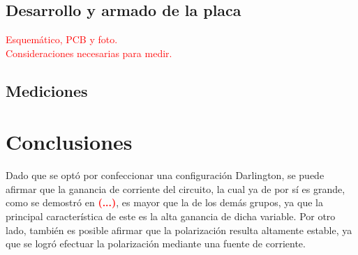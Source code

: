 \subsection{Desarrollo y armado de la placa}
\begin{center}
	\LARGE{\textcolor{red}{Esquemático, PCB y foto.}}\\
	\LARGE{\textcolor{red}{Consideraciones necesarias para medir.}}
\end{center}

\subsection{Mediciones}

\section{Conclusiones}
Dado que se optó por confeccionar una configuración Darlington, se puede afirmar que la ganancia de corriente del circuito, la cual ya de por sí es grande, como se demostró en \textcolor{red}{\textbf{(...)}}, es mayor que la de los demás grupos, ya que la principal característica de este es la alta ganancia de dicha variable. Por otro lado, también es posible afirmar que la polarización resulta altamente estable, ya que se logró efectuar la polarización mediante una fuente de corriente.
	
